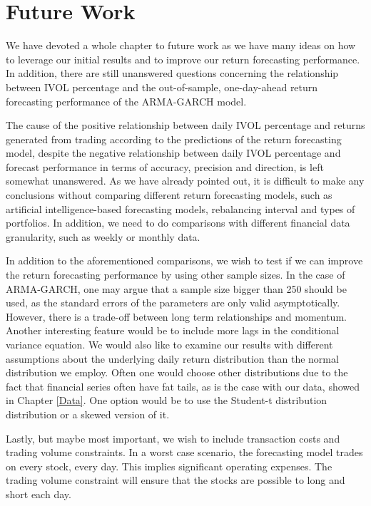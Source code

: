 \chapter{Future Work} \label{FutureWork}
\label{FW}
We have devoted a whole chapter to future work as we have many ideas on how to leverage our initial results and to improve our return forecasting performance. In addition, there are still unanswered questions concerning the relationship between IVOL percentage and the out-of-sample, one-day-ahead return forecasting performance of the ARMA-GARCH model.

The cause of the positive relationship between daily IVOL percentage and returns generated from trading according to the predictions of the return forecasting model, despite the negative relationship between daily IVOL percentage and forecast performance in terms of accuracy, precision and direction, is left somewhat unanswered. As we have already pointed out, it is difficult to make any conclusions without comparing different return forecasting models, such as artificial intelligence-based forecasting models, rebalancing interval and types of portfolios. In addition, we need to do comparisons with different financial data granularity, such as weekly or monthly data.

In addition to the aforementioned comparisons, we wish to test if we can improve the return forecasting performance by using other sample sizes. In the case of ARMA-GARCH, one may argue that a sample size bigger than 250 should be used, as the standard errors of the parameters are only valid asymptotically. However, there is a trade-off between long term relationships and momentum. Another interesting feature would be to include more lags in the conditional variance equation. We would also like to examine our results with different assumptions about the underlying daily return distribution than the normal distribution we employ. Often one would choose other distributions due to the fact that financial series often have fat tails, as is the case with our data, showed in Chapter \ref{Data}. One option would be to use the Student-t distribution distribution or a skewed version of it.

Lastly, but maybe most important, we wish to include transaction costs and trading volume constraints. In a worst case scenario, the forecasting model trades on every stock, every day. This implies significant operating expenses. The trading volume constraint will ensure that the stocks are possible to long and short each day. 


